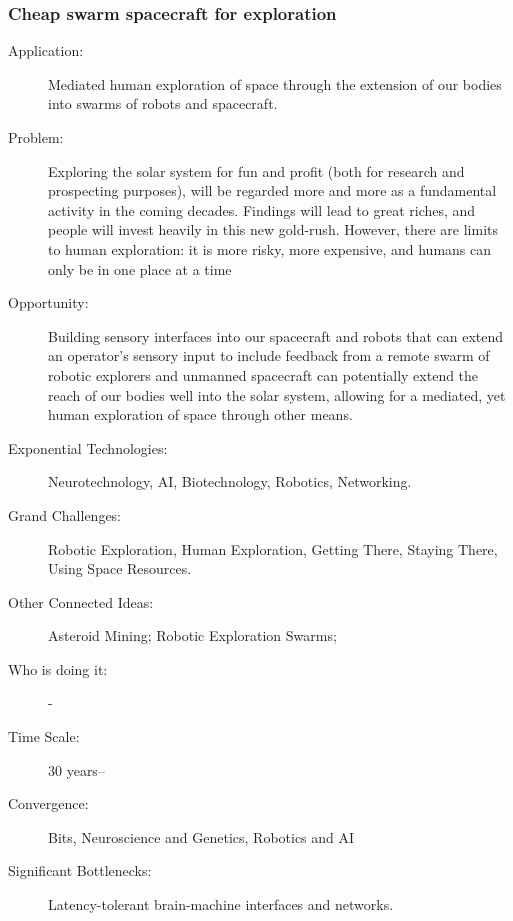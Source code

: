  
 
\subsubsection{Cheap  swarm  spacecraft for exploration}
 
 \begin{description}   \item[Application:] Mediated human exploration of space through the
extension of our bodies into   swarms of robots and spacecraft.
 
  \item[Problem:] Exploring the   solar system for fun and profit (both for
research  and prospecting  purposes), will be regarded more and more as a
fundamental activity in the  coming  decades. Findings will lead to great
riches,   and people will invest heavily in this new gold-rush. However,
there are limits to human   exploration: it is more risky, more expensive,
and  humans can only be in one  place at a time
 
  \item[Opportunity:] Building   sensory interfaces into our spacecraft and
robots  that can extend an  operator's sensory input to include feedback
from a remote swarm of robotic   explorers and unmanned spacecraft can
potentially   extend the reach of our bodies well into the solar system,
allowing for a mediated, yet  human  exploration of space through other means.
 
  \item[Exponential  Technologies:]  Neurotechnology, AI, Biotechnology,
Robotics,   Networking.
 
   \item[Grand Challenges:] Robotic  Exploration, Human Exploration,  Getting
There, Staying There, Using Space   Resources.
 
   \item[Other Connected Ideas:]  Asteroid Mining; Robotic Exploration  Swarms;
 
 
   \item[Who is doing it:] -
 
   \item[Time Scale:] 30 years--
 
  \item[Convergence:] Bits, Neuroscience and Genetics, Robotics and AI
 
  \item[Significant Bottlenecks:] Latency-tolerant brain-machine   interfaces and networks.
    \end{description}

